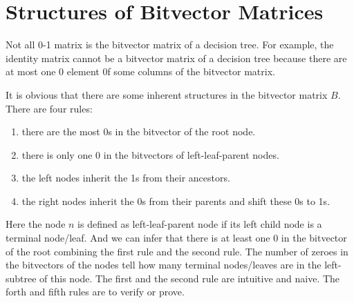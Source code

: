 \documentclass[UTF8]{article}
\begin{document}
%
%
%
%

\section{Structures of Bitvector Matrices}

Not all 0-1 matrix is the bitvector matrix of a decision tree.
For example, the identity matrix cannot be a bitvector matrix of a decision tree
because there are at most one $0$ element 0f some columns of the bitvector matrix.

It is obvious that there are some inherent structures in the bitvector matrix $B$.
There are four rules:
\begin{enumerate}
\item there are  the most $0$s in the bitvector of the root node.
\item there is only one $0$ in the bitvectors of left-leaf-parent nodes.
\item the left nodes inherit the 1s from their ancestors.
\item the right nodes inherit the 0s from their parents and shift these 0s to 1s.
\end{enumerate}
Here the node $n$ is defined as left-leaf-parent node if its left child node is a terminal node/leaf.
And we can infer that there is at least one 0 in the bitvector of the root combining the first rule and the second rule.
The number of zeroes in the bitvectors of the nodes tell how many terminal nodes/leaves are in the left-subtree of this node.
The first and the second rule are intuitive and naive.
The forth and fifth rules are to verify or prove.
\end{document}
